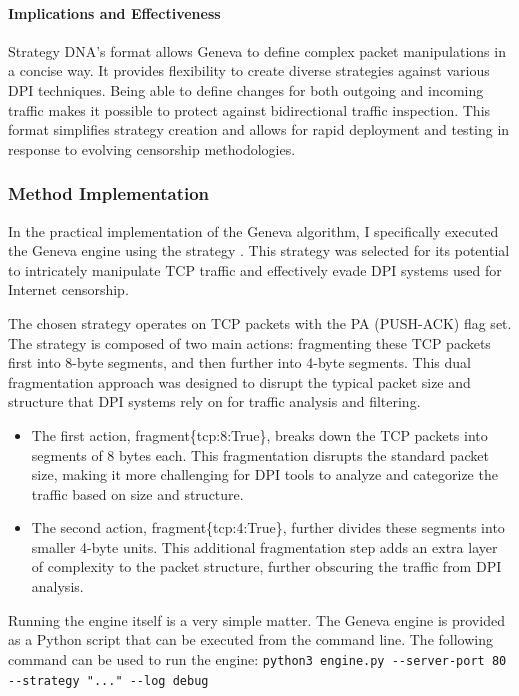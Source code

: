 \documentclass[12pt, fleqn, a4paper]{article}
\begin{document}
\paragraph{Implications and Effectiveness}
Strategy DNA's format allows Geneva to define complex packet manipulations in a concise way. 
It provides flexibility to create diverse strategies against various DPI techniques. 
Being able to define changes for both outgoing and incoming traffic makes it possible to protect against bidirectional traffic inspection.
This format simplifies strategy creation and allows for rapid deployment and testing in response to evolving censorship methodologies.


\subsubsection{Method Implementation}
In the practical implementation of the Geneva algorithm, I specifically executed the Geneva engine using the strategy . This strategy was selected for its potential to intricately manipulate TCP traffic and effectively evade DPI systems used for Internet censorship.

The chosen strategy operates on TCP packets with the PA (PUSH-ACK) flag set. The strategy is composed of two main actions: fragmenting these TCP packets first into 8-byte segments, and then further into 4-byte segments. This dual fragmentation approach was designed to disrupt the typical packet size and structure that DPI systems rely on for traffic analysis and filtering.

\begin{itemize}
\item The first action, fragment\{tcp:8:True\}, breaks down the TCP packets into segments of 8 bytes each. This fragmentation disrupts the standard packet size, making it more challenging for DPI tools to analyze and categorize the traffic based on size and structure.
\item The second action, fragment\{tcp:4:True\}, further divides these segments into smaller 4-byte units. This additional fragmentation step adds an extra layer of complexity to the packet structure, further obscuring the traffic from DPI analysis.
\end{itemize}
Running the engine itself is a very simple matter. The Geneva engine is provided as a Python script that can be executed from the command line. The following command can be used to run the engine: \verb|python3 engine.py --server-port 80 --strategy "..." --log debug |
\end{document}
